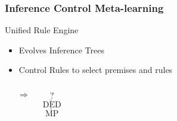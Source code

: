 \documentclass{beamer}
\begin{document}
\begin{frame}
  \frametitle{Inference Control Meta-learning}




  



  Unified Rule Engine
  \begin{itemize}
  \item<+-> Evolves \alert{Inference Trees}
  \item<+-> \alert{Control Rules} to select premises and rules
  \end{itemize}

  \begin{columns}

    \column{2in}

    {\small
      \begin{prooftree}
      \end{prooftree}
    }

    \pause

    \column{0.5in}
    $$\Rightarrow$$

    \column{0.5in}
    {\footnotesize
      $$?$$
      $$\underrightarrow{\text{DED}}$$
      $$\underrightarrow{\text{MP}}$$
      }
  \end{columns}

\end{frame}
\end{document}
